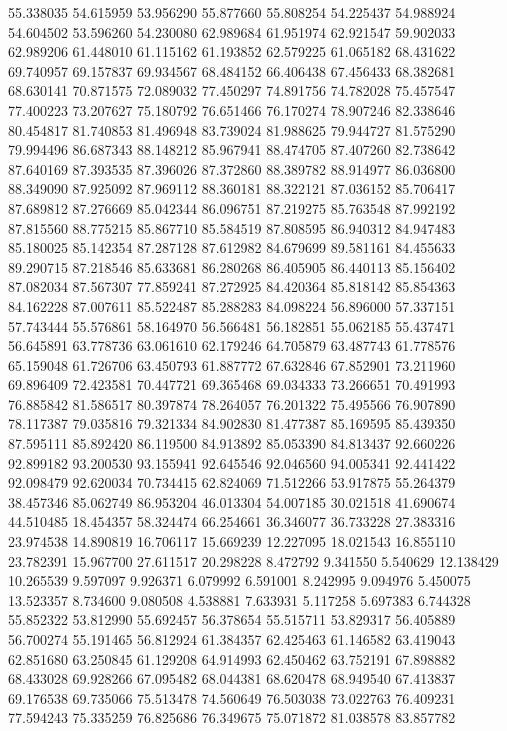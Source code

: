 55.338035
54.615959
53.956290
55.877660
55.808254
54.225437
54.988924
54.604502
53.596260
54.230080
62.989684
61.951974
62.921547
59.902033
62.989206
61.448010
61.115162
61.193852
62.579225
61.065182
68.431622
69.740957
69.157837
69.934567
68.484152
66.406438
67.456433
68.382681
68.630141
70.871575
72.089032
77.450297
74.891756
74.782028
75.457547
77.400223
73.207627
75.180792
76.651466
76.170274
78.907246
82.338646
80.454817
81.740853
81.496948
83.739024
81.988625
79.944727
81.575290
79.994496
86.687343
88.148212
85.967941
88.474705
87.407260
82.738642
87.640169
87.393535
87.396026
87.372860
88.389782
88.914977
86.036800
88.349090
87.925092
87.969112
88.360181
88.322121
87.036152
85.706417
87.689812
87.276669
85.042344
86.096751
87.219275
85.763548
87.992192
87.815560
88.775215
85.867710
85.584519
87.808595
86.940312
84.947483
85.180025
85.142354
87.287128
87.612982
84.679699
89.581161
84.455633
89.290715
87.218546
85.633681
86.280268
86.405905
86.440113
85.156402
87.082034
87.567307
77.859241
87.272925
84.420364
85.818142
85.854363
84.162228
87.007611
85.522487
85.288283
84.098224
56.896000
57.337151
57.743444
55.576861
58.164970
56.566481
56.182851
55.062185
55.437471
56.645891
63.778736
63.061610
62.179246
64.705879
63.487743
61.778576
65.159048
61.726706
63.450793
61.887772
67.632846
67.852901
73.211960
69.896409
72.423581
70.447721
69.365468
69.034333
73.266651
70.491993
76.885842
81.586517
80.397874
78.264057
76.201322
75.495566
76.907890
78.117387
79.035816
79.321334
84.902830
81.477387
85.169595
85.439350
87.595111
85.892420
86.119500
84.913892
85.053390
84.813437
92.660226
92.899182
93.200530
93.155941
92.645546
92.046560
94.005341
92.441422
92.098479
92.620034
70.734415
62.824069
71.512266
53.917875
55.264379
38.457346
85.062749
86.953204
46.013304
54.007185
30.021518
41.690674
44.510485
18.454357
58.324474
66.254661
36.346077
36.733228
27.383316
23.974538
14.890819
16.706117
15.669239
12.227095
18.021543
16.855110
23.782391
15.967700
27.611517
20.298228
8.472792
9.341550
5.540629
12.138429
10.265539
9.597097
9.926371
6.079992
6.591001
8.242995
9.094976
5.450075
13.523357
8.734600
9.080508
4.538881
7.633931
5.117258
5.697383
6.744328
55.852322
53.812990
55.692457
56.378654
55.515711
53.829317
56.405889
56.700274
55.191465
56.812924
61.384357
62.425463
61.146582
63.419043
62.851680
63.250845
61.129208
64.914993
62.450462
63.752191
67.898882
68.433028
69.928266
67.095482
68.044381
68.620478
68.949540
67.413837
69.176538
69.735066
75.513478
74.560649
76.503038
73.022763
76.409231
77.594243
75.335259
76.825686
76.349675
75.071872
81.038578
83.857782

